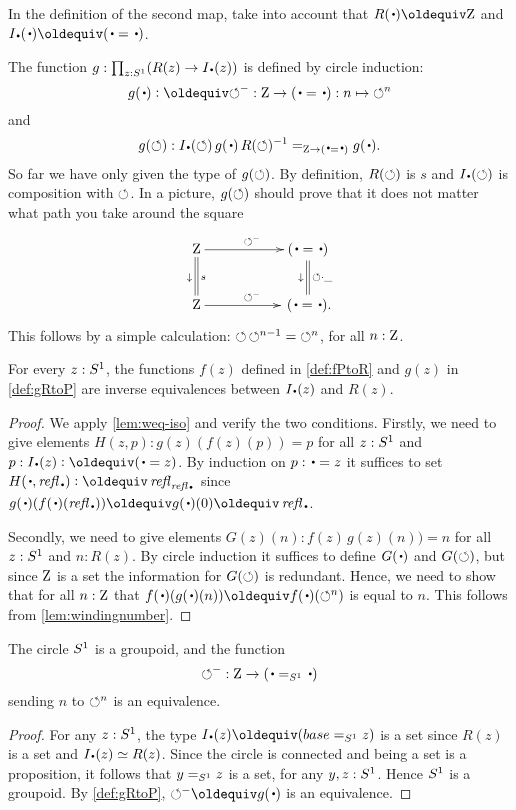 In the definition of the second map, 
take into account that $R(\base)\jdeq \zet$ and $\uc{\base}(\base) \jdeq (\base=\base)$.

\begin{definition}\label{def:gRtoP}
The function $g:\prod_{z:\Sc}(R(z)\to \uc{\base}(z))$ is 
defined by circle induction: 
\[
g(\base)\defeq {\Sloop^{-}}:\zet\to(\base=\base) : n \mapsto {\Sloop^n}
\]
and 
\[
g(\Sloop): \uc{\base}(\Sloop)\, g(\base)\,R(\Sloop)^{-1}=_{\zet\to (\base=\base)} g(\base).
\]
So far we have only given the type of $g(\circlearrowleft)$. By definition, $R(\circlearrowleft)$ is $s$
and $\uc{\base}(\Sloop)$ is composition with $\circlearrowleft$.
In a picture, $g(\circlearrowleft)$ should prove that it does not matter what 
path you take around the square
$$\xymatrix{\zet\ar[rr]^{\Sloop^-}\ar@{=}[d]^s_\downarrow
 &&(\base=\base)\ar@{=}[d]^{\Sloop\cdot\_}_\downarrow\\
  \zet\ar[rr]^{\Sloop^-}&&\,(\base=\base).}
$$
This follows by a simple calculation: ${\circlearrowleft\,\circlearrowleft^{n-1}} = {\circlearrowleft^n}$, 
for all $n:\mathrm{Z}$. 
\end{definition}


\begin{lemma}
  \label{lem:univisexp}
For every $z:{S^1}$, the functions $f(z)$ defined in \cref{def:fPtoR} 
and $g(z)$ in \cref{def:gRtoP} are inverse equivalences between
$\uc{\base}(z)$ and $R(z)$.
\end{lemma}
\begin{proof}
We apply \cref{lem:weq-iso} and verify the two conditions.
  Firstly, we need to give elements $H(z,p):g(z)(f(z)(p))=p$
for all $z:{S^1}$ and $p:\uc{\base}(z)\defeq(\base=z)$. 
By induction on $p:\base=z$ it suffices to set 
$H(\base,\refl\base)\defeq\refl{\refl{\base}}$ since
$g(\base)(f(\base)(\refl{\base}))\jdeq g(\base)(0)\jdeq\refl{\base}$.

Secondly, we need to give elements $G(z)(n):f(z)\,g(z)(n))=n$
for all $z:{S^1}$ and $n: R(z)$.
By circle induction it suffices to define $G(\base)$ and $G(\circlearrowleft)$,
but since $\mathrm{Z}$ is a set the information for $G(\circlearrowleft)$ is redundant.
Hence, we need to show that for all $n:\mathrm{Z}$ that 
$f(\base)(g(\base)(n))\jdeq  f(\base)(\Sloop^n)$ is equal to $n$.  
This follows from \cref{lem:windingnumber}. 
\end{proof}


\begin{corollary}\label{cor:S1groupoid}
The circle ${S^1}$ is a groupoid, and the function
\[
{\Sloop}^{-} : \zet\to(\base=_{\Sc}\base)
\]
sending $n$ to $\circlearrowleft^n$ is an equivalence.
\end{corollary}
\begin{proof}
For any $z:{S^1}$, the type $\uc{\base}(z)\jdeq (base=_{\Sc}z)$ is a set 
since $R(z)$ is a set and $\uc{\base}(z) \equiv R(z)$.
Since the circle is connected and being a set is a proposition, it follows
that $y=_{{S^1}}z$ is a set, for any $y,z:{S^1}$. Hence ${S^1}$ is a groupoid.
By \cref{def:gRtoP}, ${\Sloop}^{-}\jdeq g(\base)$ is an equivalence.
\end{proof}

